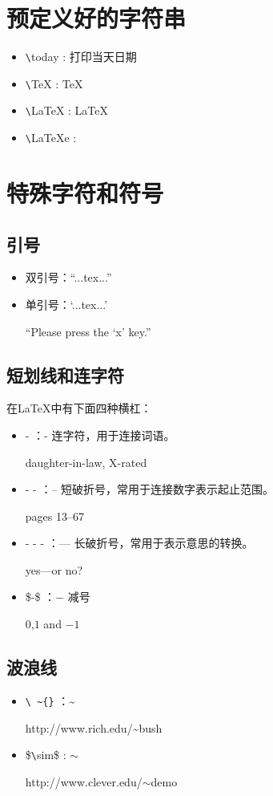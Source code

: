 \documentclass[UTF8]{ctexart}
\begin{document}
\section{预定义好的字符串}
\begin{itemize}
  \item \texttt{\textbackslash}today : 打印当天日期
  \item \texttt{\textbackslash}TeX : \TeX
  \item \texttt{\textbackslash}LaTeX : \LaTeX
  \item \texttt{\textbackslash}LaTeXe : \LaTeXe
\end{itemize}
\section{特殊字符和符号}
\subsection{引号}
\begin{itemize}
  \item 双引号：``...tex...''
  \item 单引号：`...tex...'

     ``Please press the `x' key.''
\end{itemize}
\subsection{短划线和连字符}
在\LaTeX 中有下面四种横杠：
\begin{itemize}
   \item - ：- 连字符，用于连接词语。

   daughter-in-law, X-rated
   \item - - ：-- 短破折号，常用于连接数字表示起止范围。

   pages 13--67
   \item - - - ：--- 长破折号，常用于表示意思的转换。

   yes---or no?
   \item \$-\$ ：$-$ 减号

   $0$,$1$ and $-1$
\end{itemize}
\subsection{波浪线}
\begin{itemize}
    \item \texttt{\textbackslash}\texttt{~\~}\texttt{\{}\texttt{\}} ：\~{}

http://www.rich.edu/\~{}bush
    \item \$\texttt{\textbackslash}sim\$ : $\sim$

http://www.clever.edu/$\sim$demo
\end{itemize}
\end{document}
